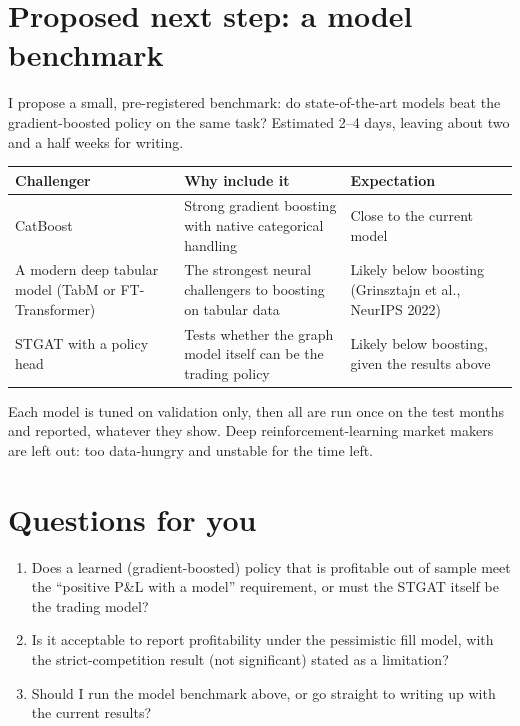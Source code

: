 \documentclass[11pt,a4paper]{article}
\begin{document}
\section{Proposed next step: a model benchmark}

I propose a small, pre-registered benchmark: do state-of-the-art models beat the gradient-boosted policy on the
same task? Estimated 2--4 days, leaving about two and a half weeks for writing.

\begin{center}
\small
\begin{tabularx}{\textwidth}{>{\raggedright\arraybackslash}p{4.4cm} L L}
\toprule
Challenger & Why include it & Expectation \\
\midrule
CatBoost & Strong gradient boosting with native categorical handling & Close to the current model \\
A modern deep tabular model (TabM or FT-Transformer) & The strongest neural challengers to boosting on tabular data
  & Likely below boosting (Grinsztajn et al., NeurIPS 2022) \\
STGAT with a policy head & Tests whether the graph model itself can be the trading policy
  & Likely below boosting, given the results above \\
\bottomrule
\end{tabularx}
\end{center}

\noindent Each model is tuned on validation only, then all are run once on the test months and reported, whatever
they show. Deep reinforcement-learning market makers are left out: too data-hungry and unstable for the time left.

\section{Questions for you}

\begin{enumerate}
  \item Does a learned (gradient-boosted) policy that is profitable out of sample meet the ``positive P\&L with a
        model'' requirement, or must the STGAT itself be the trading model?
  \item Is it acceptable to report profitability under the pessimistic fill model, with the strict-\allowbreak{}competition
        result (not significant) stated as a limitation?
  \item Should I run the model benchmark above, or go straight to writing up with the current results?
\end{enumerate}
\end{document}
